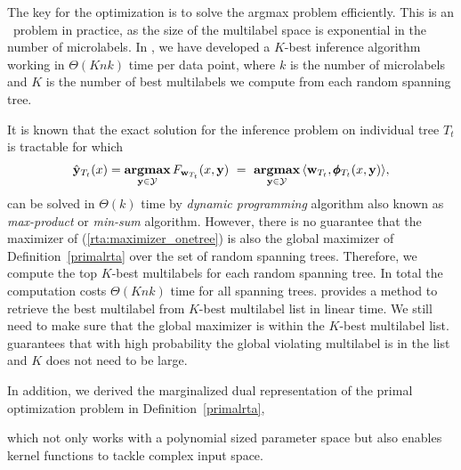 {The key for the optimization is to solve the argmax problem efficiently.
This is an \nphard\ problem in practice, as the size of the multilabel space is exponential in the number of microlabels.
In , we have developed a $K$-best inference algorithm working in $\Theta(Knk)$ time per data point, where $k$ is the number of microlabels and $K$ is the number of best multilabels we compute from each random spanning tree.

It is known that the exact solution for the inference problem on individual tree $T_t$ is tractable \citep{Koller09probabilistic} for which 
\begin{align}
	\hat{\mathbf {y}}_{T_t}(x) = \underset{\mathbf {y}\in\mathcal{Y}}{\textbf{argmax}}\, F_{\mathbf {w}_{T_t}}(x,\mathbf {y})\ =\ \underset{\mathbf {y}\in\mathcal{Y}}{\textbf{argmax}}\, \langle \mathbf {w}_{T_t}, \pmb \phi_{T_t}(x,\mathbf {y})\rangle, \label{rta:maximizer_onetree}
\end{align}
can be solved in $\Theta(k)$ time by \textit{dynamic programming} algorithm also known as \textit{max-product} or \textit{min-sum} algorithm.
However, there is no guarantee that the maximizer of (\ref{rta:maximizer_onetree}) is also the global maximizer of Definition~\ref{primalrta} over the set of random spanning trees.
Therefore, we compute the top $K$-best multilabels for each random spanning tree.
In total the computation costs $\Theta(Knk)$ time for all spanning trees.
 provides a method to retrieve the best multilabel from $K$-best multilabel list in linear time.
We still need to make sure that the global maximizer is within the $K$-best multilabel list.
 guarantees that with high probability the global violating multilabel is in the list and $K$ does not need to be large.

In addition, we derived the marginalized dual representation of the primal optimization problem in Definition~\ref{primalrta},

which not only works with a polynomial sized parameter space but also enables kernel functions to tackle complex input space.



}
